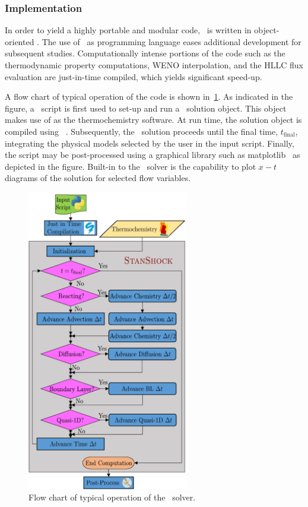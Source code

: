 \subsubsection{Implementation}
In order to yield a highly portable and modular code, \stnshk\ is written in object-oriented \python. The use of \python\ as programming language eases additional development for subsequent studies. Computationally intense portions of the code such as the thermodynamic property computations, WENO interpolation, and the HLLC flux evaluation are just-in-time compiled, which yields significant speed-up. 

A flow chart of typical operation of the code is shown in~\ref{FIG_FLOWCHART}. As indicated in the figure, a \python\ script is first used to set-up and run a \stnshk\ solution object. This object makes use of {} as the thermochemistry software. At run time, the solution object is compiled using {}~\cite{Lam2015NumbaAL}. Subsequently, the \stnshk\ solution proceeds until the final time, $t_\mathrm{final}$, integrating the physical models selected by the user in the input script. Finally, the script may be post-processed using a graphical library such as matplotlib~\cite{Hunter_matplotlib_2007} as depicted in the figure. Built-in to the \stnshk\ solver is the capability to plot $x-t$ diagrams of the solution for selected flow variables.

\begin{figure}[!h!]
	\begin{center}
		\includegraphics[width=70mm]{flowDiagram}
	\end{center}
	\caption{\label{FIG_FLOWCHART}Flow chart of typical operation of the \stnshk\ solver.}
\end{figure}
